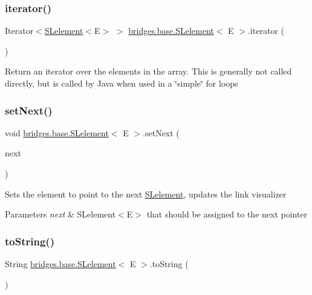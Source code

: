 \subsubsection{\texorpdfstring{iterator()}{iterator()}}
{\footnotesize\ttfamily Iterator$<$\hyperlink{classbridges_1_1base_1_1_s_lelement}{S\+Lelement}$<$E$>$ $>$ \hyperlink{classbridges_1_1base_1_1_s_lelement}{bridges.\+base.\+S\+Lelement}$<$ E $>$.iterator (\begin{DoxyParamCaption}{ }\end{DoxyParamCaption})}

Return an iterator over the elements in the array. This is generally not called directly, but is called by Java when used in a \char`\"{}simple\char`\"{} for loops \mbox{\label{classbridges_1_1base_1_1_s_lelement_afdd42f03071b2614822b73729e1a5a1a}} 
\subsubsection{\texorpdfstring{set\+Next()}{setNext()}}
{\footnotesize\ttfamily void \hyperlink{classbridges_1_1base_1_1_s_lelement}{bridges.\+base.\+S\+Lelement}$<$ E $>$.set\+Next (\begin{DoxyParamCaption}\item[{\hyperlink{classbridges_1_1base_1_1_s_lelement}{S\+Lelement}$<$ E $>$}]{next }\end{DoxyParamCaption})}

Sets the element to point to the next \hyperlink{classbridges_1_1base_1_1_s_lelement}{S\+Lelement}, updates the link visualizer


\begin{DoxyParams}{Parameters}
{\em next} & S\+Lelement$<$\+E$>$ that should be assigned to the next pointer \\
\hline
\end{DoxyParams}
\mbox{\label{classbridges_1_1base_1_1_s_lelement_af0ec4da5b29d0f5ab6ab38e91cca51f9}} 
\subsubsection{\texorpdfstring{to\+String()}{toString()}}
{\footnotesize\ttfamily String \hyperlink{classbridges_1_1base_1_1_s_lelement}{bridges.\+base.\+S\+Lelement}$<$ E $>$.to\+String (\begin{DoxyParamCaption}{ }\end{DoxyParamCaption})}



